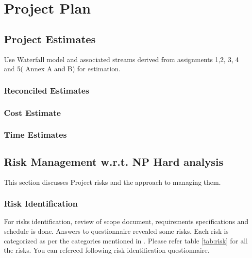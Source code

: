 \documentclass[12pt,a4paper]{article}
\begin{document}

\section{Project Plan}
\setcounter{section}{6}


\subsection{Project Estimates}
                 Use Waterfall model and associated streams derived from assignments 1,2, 3, 4 and 5( Annex A and B) for estimation. 
\subsubsection{Reconciled Estimates}
\subsubsection{Cost Estimate}

\subsubsection{Time Estimates}



\subsection{Risk Management w.r.t. NP Hard analysis}
This section discusses Project risks and the approach to managing them.
\subsubsection{Risk Identification}
For risks identification, review of scope document, requirements specifications and schedule is done. Answers to questionnaire revealed some risks. Each risk is categorized as per the categories mentioned in \cite{bookPressman}. Please refer table \ref{tab:risk} for all the risks. You can refereed following risk identification questionnaire.
\end{document}
